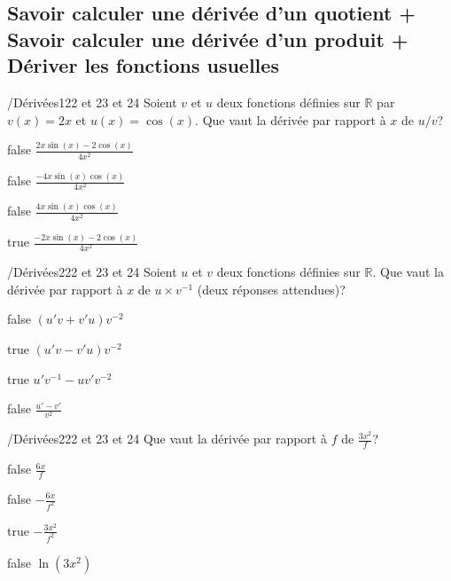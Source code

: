 \documentclass[11pt]{article}
\begin{document}
        \subsection{Savoir calculer une dérivée d'un quotient + Savoir calculer une dérivée d'un produit + Dériver les fonctions usuelles}
        
        	\begin{question}{/}{Dérivées}{1}{22 et 23 et 24}
				Soient $v$ et $u$ deux fonctions définies sur $\mathbb{R}$ par $v(x)=2x$ et $u(x)=\cos(x)$. Que vaut la dérivée par rapport à $x$ de $u/v$?
            \end{question}

            \begin{reponses}
            	\item[false] $\frac{2x\sin(x)-2\cos(x)}{4x^2}$
            	\item[false] $\frac{-4x\sin(x)\cos(x)}{4x^2}$
                \item[false] $\frac{4x\sin(x)\cos(x)}{4x^2}$
                \item[true] $\frac{-2x\sin(x)-2\cos(x)}{4x^2}$
            \end{reponses}

            \begin{question}{/}{Dérivées}{2}{22 et 23 et 24}
                Soient $u$ et $v$ deux fonctions définies sur $\mathbb{R}$. Que vaut la dérivée par rapport à $x$ de $u\times v^{-1}$ (deux réponses attendues)?
            \end{question}

            \begin{reponses}
            	\item[false] $(u'v+v'u)v^{-2}$
            	\item[true] $(u'v-v'u)v^{-2}$
                \item[true] $u'v^{-1}-uv'v^{-2}$
                \item[false] $\frac{u'-v'}{v^2}$
            \end{reponses}

            \begin{question}{/}{Dérivées}{2}{22 et 23 et 24}
                Que vaut la dérivée par rapport à $f$ de $\frac{3x^2}{f}$?
            \end{question}

            \begin{reponses}
                \item[false] $\frac{6x}{f}$
                \item[false] $-\frac{6x}{f^2}$
                \item[true] $-\frac{3x^2}{f^2}$
                \item[false] $\ln(3x^2)$
            \end{reponses}
\end{document}
